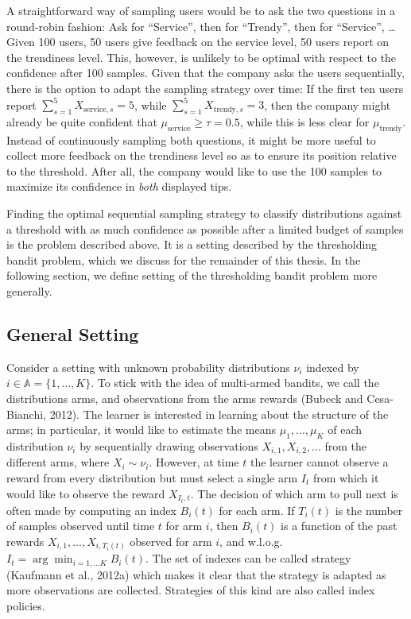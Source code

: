 \documentclass[11pt,]{article}
\begin{document}
A straightforward way of sampling users would be to ask the two
questions in a round-robin fashion: Ask for ``Service'', then for
``Trendy'', then for ``Service'', \ldots{} Given 100 users, 50 users
give feedback on the service level, 50 users report on the trendiness
level. This, however, is unlikely to be optimal with respect to the
confidence after 100 samples. Given that the company asks the users
sequentially, there is the option to adapt the sampling strategy over
time: If the first ten users report
\(\sum_{s=1}^{5}X_{\text{service},s}=5\), while
\(\sum_{s=1}^{5}X_{\text{trendy},s}=3\), then the company might already
be quite confident that \(\mu_{\text{service}} \geq \tau = 0.5\), while
this is less clear for \(\mu_{\text{trendy}}\). Instead of continuously
sampling both questions, it might be more useful to collect more
feedback on the trendiness level so as to ensure its position relative
to the threshold. After all, the company would like to use the 100
samples to maximize its confidence in \emph{both} displayed tips.

Finding the optimal sequential sampling strategy to classify
distributions against a threshold with as much confidence as possible
after a limited budget of samples is the problem described above. It is
a setting described by the thresholding bandit problem, which we discuss
for the remainder of this thesis. In the following section, we define
setting of the thresholding bandit problem more generally.

\subsection{\texorpdfstring{General Setting
\label{sec:Setup}}{General Setting }}\label{general-setting}

Consider a setting with unknown probability distributions \(\nu_i\)
indexed by \(i \in \mathbb{A}=\{1, ..., K\}\). To stick with the idea of
multi-armed bandits, we call the distributions arms, and observations
from the arms rewards (Bubeck and Cesa-Bianchi, 2012). The learner is
interested in learning about the structure of the arms; in particular,
it would like to estimate the means \(\mu_1, ..., \mu_K\) of each
distribution \(\nu_i\) by sequentially drawing observations
\(X_{i,1}, X_{i,2}, ...\) from the different arms, where
\(X_{i} \sim \nu_i\). However, at time \(t\) the learner cannot observe
a reward from every distribution but must select a single arm \(I_t\)
from which it would like to observe the reward \(X_{I_t,t}\). The
decision of which arm to pull next is often made by computing an index
\(B_i(t)\) for each arm. If \(T_i(t)\) is the number of samples observed
until time \(t\) for arm \(i\), then \(B_i(t)\) is a function of the
past rewards \(X_{i,1}, ..., X_{i,T_i(t)}\) observed for arm \(i\), and
w.l.o.g. \(I_t = \arg \min_{i = 1,...K} B_i(t)\). The set of indexes can
be called strategy (Kaufmann et al., 2012a) which makes it clear that
the strategy is adapted as more observations are collected. Strategies
of this kind are also called index policies.
\end{document}
